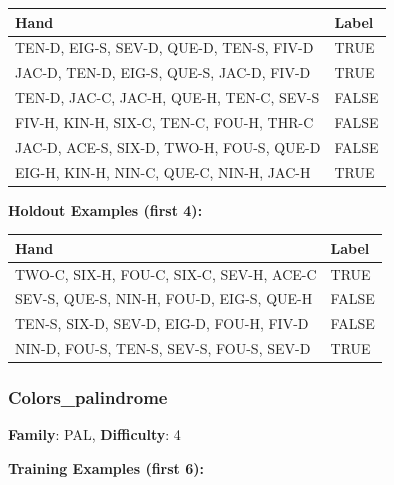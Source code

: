 \documentclass[10pt,a4paper]{article}
\begin{document}
\begin{small}
\begin{tabular}{p{8cm}l}
\toprule
Hand & Label \\
\midrule
TEN-D, EIG-S, SEV-D, QUE-D, TEN-S, FIV-D & \textcolor{positive}{TRUE} \\
JAC-D, TEN-D, EIG-S, QUE-S, JAC-D, FIV-D & \textcolor{positive}{TRUE} \\
TEN-D, JAC-C, JAC-H, QUE-H, TEN-C, SEV-S & \textcolor{negative}{FALSE} \\
FIV-H, KIN-H, SIX-C, TEN-C, FOU-H, THR-C & \textcolor{negative}{FALSE} \\
JAC-D, ACE-S, SIX-D, TWO-H, FOU-S, QUE-D & \textcolor{negative}{FALSE} \\
EIG-H, KIN-H, NIN-C, QUE-C, NIN-H, JAC-H & \textcolor{positive}{TRUE} \\
\bottomrule
\end{tabular}
\end{small}

\textbf{Holdout Examples (first 4):}

\begin{small}
\begin{tabular}{p{8cm}l}
\toprule
Hand & Label \\
\midrule
TWO-C, SIX-H, FOU-C, SIX-C, SEV-H, ACE-C & \textcolor{positive}{TRUE} \\
SEV-S, QUE-S, NIN-H, FOU-D, EIG-S, QUE-H & \textcolor{negative}{FALSE} \\
TEN-S, SIX-D, SEV-D, EIG-D, FOU-H, FIV-D & \textcolor{negative}{FALSE} \\
NIN-D, FOU-S, TEN-S, SEV-S, FOU-S, SEV-D & \textcolor{positive}{TRUE} \\
\bottomrule
\end{tabular}
\end{small}

\vspace{0.5cm}

\subsubsection{Colors\_palindrome}

\textbf{Family}: PAL, \textbf{Difficulty}: 4

\textbf{Training Examples (first 6):}
\end{document}
